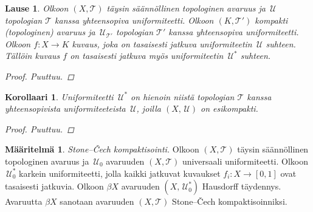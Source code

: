 \documentclass[12pt,a4paper,leqno]{report}
\newcommand{\U}{\,\mathcal{U}}
\newcommand{\T}{\mathcal{T}}
\theoremstyle{plain}
\newtheorem{lause}[equation]{Lause}
\newtheorem{kor}[equation]{Korollaari}
\theoremstyle{definition}
\newtheorem{maar}[equation]{Määritelmä}
\theoremstyle{remark}
\begin{document}
\begin{lause}
Olkoon $(X,\T)$ täysin säännöllinen topologinen avaruus 
ja $\U$ topologian $\T$ kanssa yhteensopiva uniformiteetti. 
Olkoon $(K,\T')$ kompakti (topologinen) avaruus ja 
$\U_{\T'}$ topologian $\T'$ kanssa yhteensopiva uniformiteetti. 
Olkoon $f\colon X\rightarrow K$ kuvaus, joka on tasaisesti jatkuva uniformiteetin $\U$ suhteen. 
Tällöin kuvaus $f$ on tasaisesti jatkuva myös uniformiteetin $\U^*$ suhteen. 
\begin{proof}
Puuttuu.
\end{proof}
\end{lause}

\begin{kor}
Uniformiteetti $\U^*$ on hienoin niistä topologian $\T$ 
kanssa yhteensopivista uniformiteeteista $\U$, 
joilla $(X,\U)$ on esikompakti. 
\begin{proof}
Puuttuu.
\end{proof}
\end{kor}

\begin{maar}
\emph{Stone–Čech kompaktisointi.}
Olkoon $(X,\T)$ täysin säännöllinen topologinen avaruus ja 
$\U_0$ avaruuden $(X,\T)$ universaali uniformiteetti. 
Olkoon $\U^{*}_{0}$ karkein uniformiteetti, 
jolla kaikki jatkuvat kuvaukset $f_i\colon X\rightarrow [0,1]$ 
ovat tasaisesti jatkuvia. 
Olkoon $\beta X$ avaruuden $(X,\U^{*}_{0})$ Hausdorff täydennys.
Avaruutta $\beta X$ sanotaan avaruuden $(X,\T)$ 
Stone–Čech kompaktisoinniksi.
\end{maar}

\end{document}
